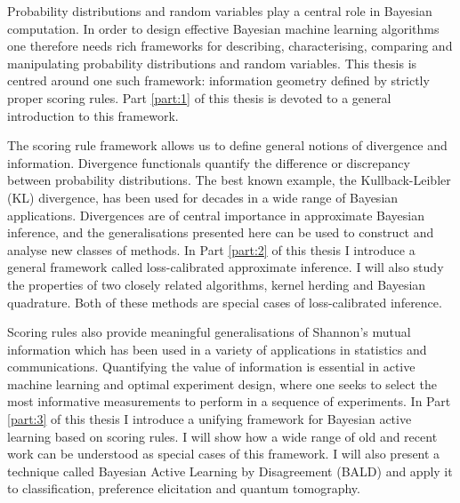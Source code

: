 \begin{abstracts}        %

Probability distributions and random variables play a central role in Bayesian computation. In order to design effective Bayesian machine learning algorithms one therefore needs rich frameworks for describing, characterising, comparing and manipulating probability distributions and random variables. This thesis is centred around one such framework: information geometry defined by strictly proper scoring rules. Part \ref{part:1} of this thesis is devoted to a general introduction to this framework.

The scoring rule framework allows us to define general notions of divergence and information. Divergence functionals quantify the difference or discrepancy between probability distributions. The best known example, the Kullback-Leibler (KL) divergence, has been used for decades in a wide range of Bayesian applications. Divergences are of central importance in approximate Bayesian inference, and the generalisations presented here can be used to construct and analyse new classes of methods. In Part \ref{part:2} of this thesis I introduce a general framework called loss-calibrated approximate inference. I will also study the properties of two closely related algorithms, kernel herding and Bayesian quadrature. Both of these methods are special cases of loss-calibrated inference.

Scoring rules also provide meaningful generalisations of Shannon's mutual information which has been used in a variety of applications in statistics and communications. Quantifying the value of information is essential in active machine learning and optimal experiment design, where one seeks to select the most informative measurements to perform in a sequence of experiments. In Part \ref{part:3} of this thesis I introduce a unifying framework for Bayesian active learning based on scoring rules. I will show how a wide range of old and recent work can be understood as special cases of this framework. I will also present a technique called Bayesian Active Learning by Disagreement (BALD) and apply it to classification, preference elicitation and quantum tomography.

\end{abstracts}